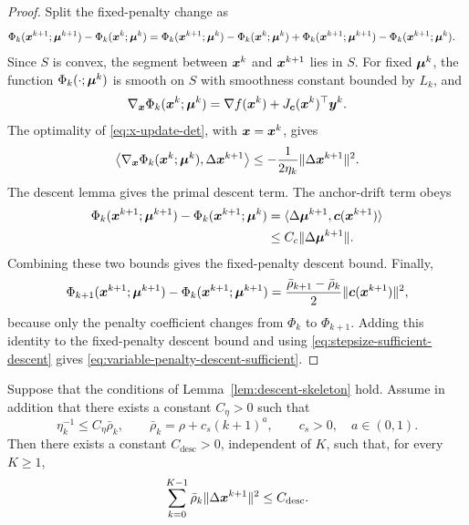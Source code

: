 \documentclass[10pt]{article}
\begin{document}
\begin{proof}
Split the fixed-penalty change as
\[
\begin{aligned}
    \Phi_k(\bm{x}^{k+1};\bm{\mu}^{k+1})-\Phi_k(\bm{x}^k;\bm{\mu}^k)
    &=
    \Phi_k(\bm{x}^{k+1};\bm{\mu}^k)-\Phi_k(\bm{x}^k;\bm{\mu}^k) +
    \Phi_k(\bm{x}^{k+1};\bm{\mu}^{k+1})-\Phi_k(\bm{x}^{k+1};\bm{\mu}^k).
\end{aligned}
\]
Since $S$ is convex, the segment between $\bm{x}^k$ and $\bm{x}^{k+1}$ lies in
$S$.  For fixed $\bm{\mu}^k$, the function $\Phi_k(\cdot;\bm{\mu}^k)$ is smooth on
$S$ with smoothness constant bounded by $L_k$, and
\[
    \nabla_{\bm{x}}\Phi_k(\bm{x}^k;\bm{\mu}^k)
    =
    \nabla f(\bm{x}^k)+J_{\bm{c}}(\bm{x}^k)^\top\bm{y}^k .
\]
The optimality of \eqref{eq:x-update-det}, with $\bm{x}=\bm{x}^k$, gives
\[
    \left\langle \nabla_{\bm{x}}\Phi_k(\bm{x}^k;\bm{\mu}^k),\Delta\bm{x}^{k+1}\right\rangle
    \le
    -\frac{1}{2\eta_k}\|\Delta\bm{x}^{k+1}\|^2 .
\]
The descent lemma gives the primal descent term.  The anchor-drift term obeys
\[
\begin{aligned}
    \Phi_k(\bm{x}^{k+1};\bm{\mu}^{k+1})-\Phi_k(\bm{x}^{k+1};\bm{\mu}^k)
    &=
    \langle \Delta\bm{\mu}^{k+1},\bm{c}(\bm{x}^{k+1})\rangle\\
    &\le C_c\|\Delta\bm{\mu}^{k+1}\|.
\end{aligned}
\]
Combining these two bounds gives the fixed-penalty descent bound.  Finally,
\[
    \Phi_{k+1}(\bm{x}^{k+1};\bm{\mu}^{k+1})
    -
    \Phi_k(\bm{x}^{k+1};\bm{\mu}^{k+1})
    =
    \frac{\bar\rho_{k+1}-\bar\rho_k}{2}\|\bm{c}(\bm{x}^{k+1})\|^2 ,
\]
because only the penalty coefficient changes from $\Phi_k$ to $\Phi_{k+1}$.
Adding this identity to the fixed-penalty descent bound and using
\eqref{eq:stepsize-sufficient-descent} gives
\eqref{eq:variable-penalty-descent-sufficient}.
\end{proof}

\begin{lemma}
\label{lem:weighted-finite-length}
Suppose that the conditions of Lemma~\ref{lem:descent-skeleton} hold.
Assume in addition that there exists a constant $C_\eta>0$ such that
\[
    \eta_k^{-1}\le C_\eta\bar\rho_k,
    \qquad
    \bar\rho_k=\rho+c_s(k+1)^a,
    \qquad
    c_s>0,\quad a\in(0,1).
\]
Then there exists a constant $C_{\mathrm{desc}}>0$, independent of $K$,
such that, for every $K\ge1$,
\begin{equation}\label{eq:weighted-finite-length}
    \sum_{k=0}^{K-1}
    \bar\rho_k\|\Delta\bm{x}^{k+1}\|^2
    \le
    C_{\mathrm{desc}} .
\end{equation}
\end{lemma}
\end{document}
